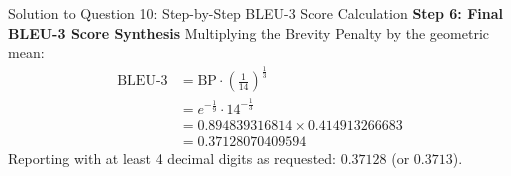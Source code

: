 \documentclass[11pt,a4paper]{article}
\begin{document}
\begin{solutionbox}{Solution to Question 10: Step-by-Step BLEU-3 Score Calculation}
\medskip
\noindent
\textbf{Step 6: Final BLEU-3 Score Synthesis}
Multiplying the Brevity Penalty by the geometric mean:
\begin{align*}
    \text{BLEU-3} &= \text{BP} \cdot \left( \frac{1}{14} \right)^{\frac{1}{3}} \\
    &= e^{-\frac{1}{9}} \cdot 14^{-\frac{1}{3}} \\
    &= 0.894839316814 \times 0.414913266683 \\
    &= \mathbf{0.37128070409594}
\end{align*}
Reporting with at least 4 decimal digits as requested: $\mathbf{0.37128}$ (or $\mathbf{0.3713}$).
\end{solutionbox}

\vspace{1.5em}

\end{document}
